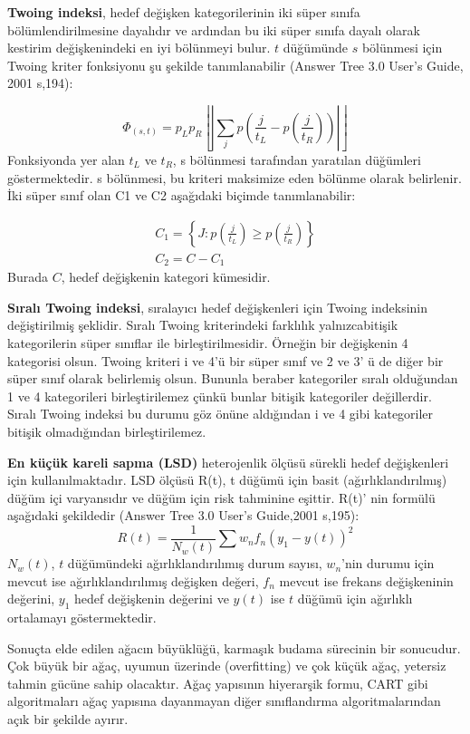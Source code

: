 \documentclass[12pt,twoside]{deuthesis}
\begin{document}
\textbf{Twoing indeksi}, hedef değişken kategorilerinin iki süper sınıfa bölümlendirilmesine dayalıdır ve ardından bu iki süper sınıfa dayalı olarak kestirim değişkenindeki en iyi bölünmeyi bulur. \(t\) düğümünde \(s\) bölünmesi için Twoing kriter fonksiyonu şu şekilde tanımlanabilir (Answer Tree 3.0 User's Guide, 2001 s,194):

\[
\Phi_{(s, t)}=p_{L} p_{R}\left\lfloor\left|\sum_{j} p\left(\frac{j}{t_{L}}-p\left(\frac{j}{t_{R}}\right)\right)\right|\right\rfloor
\]
Fonksiyonda yer alan \({t_{L}}\) ve \({t_{R}}\), s bölünmesi tarafından yaratılan düğümleri göstermektedir. s bölünmesi, bu kriteri maksimize eden bölünme olarak belirlenir. İki süper sınıf olan C1 ve C2 aşağıdaki biçimde tanımlanabilir:

\[
\begin{array}{c}C_{1}=\left\{J: p\left(\frac{j}{t_{L}}\right) \geq p\left(\frac{j}{t_{R}}\right)\right\} \\C_{2}=C-C_{1}\end{array}
\]
Burada \(C\), hedef değişkenin kategori kümesidir.

\textbf{Sıralı Twoing indeksi}, sıralayıcı hedef değişkenleri için Twoing indeksinin değiştirilmiş şeklidir. Sıralı Twoing kriterindeki farklılık yalnızcabitişik kategorilerin süper sınıflar ile birleştirilmesidir. Örneğin bir değişkenin 4 kategorisi olsun. Twoing kriteri i ve 4'ü bir süper sınıf ve 2 ve 3' ü de diğer bir süper sınıf olarak belirlemiş olsun. Bununla beraber kategoriler sıralı olduğundan 1 ve 4 kategorileri birleştirilemez çünkü bunlar bitişik kategoriler değillerdir. Sıralı Twoing indeksi bu durumu göz önüne aldığından i ve 4 gibi kategoriler bitişik olmadığından birleştirilemez.

\textbf{En küçük kareli sapma (LSD)} heterojenlik ölçüsü sürekli hedef değişkenleri için kullanılmaktadır. LSD ölçüsü R(t), t düğümü için basit (ağırlıklandırılmış) düğüm içi varyansıdır ve düğüm için risk tahminine eşittir. R(t)' nin formülü aşağıdaki şekildedir (Answer Tree 3.0 User's Guide,2001 s,195):
\[
R(t)=\frac{1}{N_{w}(t)} \sum w_{n} f_{n}\left(y_{1}-y(t)\right)^{2}
\]
\(N_w(t)\), \(t\) düğümündeki ağırlıklandırılımış durum sayısı, \(w_n\)'nin durumu için mevcut ise ağırlıklandırılımış değişken değeri, \(f_n\) mevcut ise frekans değişkeninin değerini, \(y_1\) hedef değişkenin değerini ve \(y(t)\) ise \(t\) düğümü için ağırlıklı ortalamayı göstermektedir.

Sonuçta elde edilen ağacın büyüklüğü, karmaşık budama sürecinin bir sonucudur. Çok büyük bir ağaç, uyumun üzerinde (overfitting) ve çok küçük ağaç, yetersiz tahmin gücüne sahip olacaktır. Ağaç yapısının hiyerarşik formu, CART gibi algoritmaları ağaç yapısına dayanmayan diğer sınıflandırma algoritmalarından açık bir şekilde ayırır.
\end{document}

